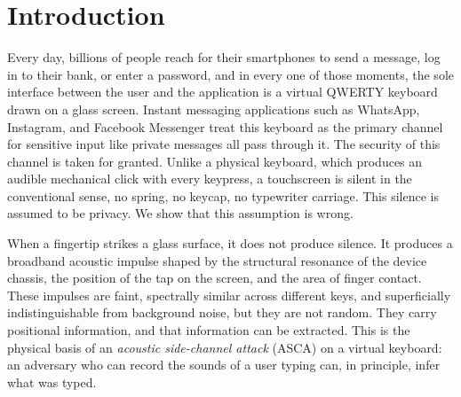 \documentclass[conference]{IEEEtran}
\begin{document}
\section{Introduction}
Every day, billions of people reach for their smartphones to send
a message, log in to their bank, or enter a password, and in
every one of those moments, the sole interface between the user
and the application is a virtual QWERTY keyboard drawn on a glass
screen. Instant messaging applications such as WhatsApp, Instagram, and Facebook
Messenger treat this keyboard as the
primary channel for sensitive input like private messages all pass through it. The security of this channel is taken for granted. Unlike a physical keyboard, which produces an audible mechanical click with every keypress, a touchscreen is silent in the conventional sense, no spring, no keycap, no typewriter
carriage. This silence is assumed to be privacy. We show that this assumption is wrong.

When a fingertip strikes a glass surface, it does not produce
silence. It produces a broadband acoustic impulse shaped by the
structural resonance of the device chassis, the position of the
tap on the screen, and the area of finger contact. These impulses
are faint, spectrally similar across different keys, and
superficially indistinguishable from background noise, but they
are not random. They carry positional information, and that
information can be extracted. This is the physical basis of an
\emph{acoustic side-channel attack} (ASCA) on a virtual keyboard:
an adversary who can record the sounds of a user typing can,
in principle, infer what was typed.
\end{document}
